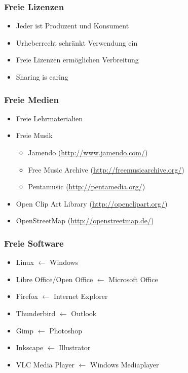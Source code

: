 \documentclass[14pt,handout]{beamer}
\newcommand{\ben}[1]{\pdfcomment[author=Ben]{#1}}
\begin{document}
\begin{frame}
    \frametitle{Freie Lizenzen}
    \begin{itemize}
        \item<2-> Jeder ist Produzent und Konsument
        \item<3-> Urheberrecht schränkt Verwendung ein
        \item<4-> Freie Lizenzen ermöglichen Verbreitung
        \item<5-> Sharing is caring
    \end{itemize}
\end{frame}

\begin{frame}
    \frametitle{Freie Medien}
    \begin{itemize}
        \item<2-> Freie Lehrmaterialien
        \item<3-> Freie Musik
            \begin{itemize}
                \item Jamendo (\url{http://www.jamendo.com/})
                \item Free Music Archive (\url{http://freemusicarchive.org/})
                \item Pentamusic (\url{http://pentamedia.org/})
            \end{itemize}
        \item<4-> Open Clip Art Library (\url{http://openclipart.org/})
        \item<5-> OpenStreetMap (\url{http://openstreetmap.de/})
    \end{itemize}
\end{frame}

\begin{frame}
    \frametitle{Freie Software}
    \begin{itemize}
        \item Linux $ \gets $ Windows
        \item Libre Office/Open Office $ \gets $ Microsoft Office
        \item Firefox $ \gets $ Internet Explorer
        \item Thunderbird $ \gets $ Outlook
        \item Gimp $ \gets $ Photoshop
        \item Inkscape $ \gets $ Illustrator
        \item VLC Media Player $ \gets $ Windows Mediaplayer
    \end{itemize}
\end{frame}
\end{document}
